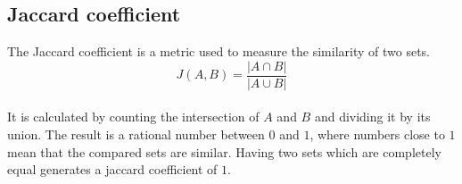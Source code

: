 \subsection{Jaccard coefficient}

The Jaccard coefficient is a metric used to measure the similarity of two sets.\\

\begin{equation}
    J(A,B) = \frac{ | A \cap B | }{ | A \cup B | }
\end{equation}\\

It is calculated by counting the intersection of $ A $ and $ B $ and dividing it by its union. The result is a rational number between $ 0 $ and $ 1 $, where numbers close to $ 1 $ mean that the compared sets are similar. Having two sets which are completely equal generates a jaccard coefficient of $ 1 $.\\